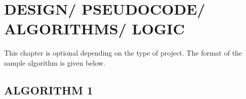 
\chapter{\uppercase{Design/ Pseudocode/ Algorithms/ Logic}} %
\label{chap4} %
This chapter is optional depending on the type of project. The format of the sample algorithm is given below.

\section{\uppercase{Algorithm 1}}



